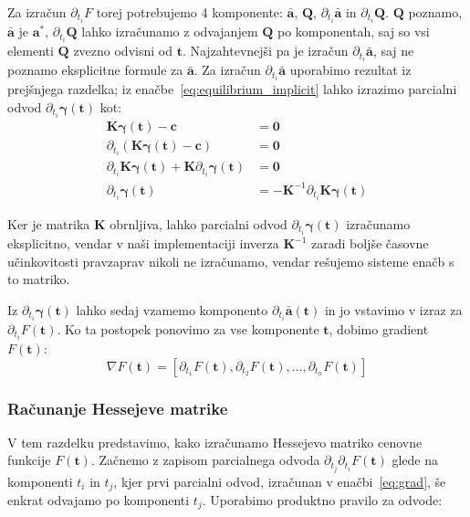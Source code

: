 \documentclass[isrm2, tisk]{fmfdelo}
\newcommand{\aimplicit}{\bar{\mathbf{a}}}
\newcommand{\yimplicit}{\mathbf{\gamma}}
\newcommand{\qmat}{\mathbf{Q}}
\newcommand{\kmat}{\mathbf{K}}
\newcommand{\avec}{\mathbf{a}}
\newcommand{\tvec}{\mathbf{t}}
\begin{document}
Za izračun $\partial_{t_i}F$ torej potrebujemo 4 komponente: $\aimplicit$, $\qmat$, $\partial_{t_i}\aimplicit$ in $\partial_{t_i}\qmat$. $\qmat$ poznamo, $\aimplicit$ je $\avec^*$, $\partial_{t_i}\qmat$ lahko izračunamo z odvajanjem $\qmat$ po komponentah, saj so vsi elementi $\qmat$ zvezno odvisni od $\tvec$. Najzahtevnejši pa je izračun $\partial_{t_i}\aimplicit$, saj ne poznamo eksplicitne formule za $\aimplicit$. Za izračun $\partial_{t_i}\aimplicit$ uporabimo rezultat iz prejšnjega razdelka; iz enačbe~\eqref{eq:equilibrium_implicit} lahko izrazimo parcialni odvod $\partial_{t_i} \yimplicit(\tvec)$ kot:
\begin{equation}
    \label{eq:dkkt}
    \begin{aligned}
        \kmat \yimplicit(\tvec) - \mathbf{c} &= \mathbf{0} \\
        \partial_{t_i}(\kmat \yimplicit(\tvec) - \mathbf{c}) &= \mathbf{0} \\
        \partial_{t_i}\kmat \yimplicit(\tvec) + \kmat \partial_{t_i} \yimplicit(\tvec) &= \mathbf{0} \\
        \partial_{t_i} \yimplicit(\tvec) &= - \kmat^{-1} \partial_{t_i}\kmat \yimplicit(\tvec)
    \end{aligned}
\end{equation}

Ker je matrika $\kmat$ obrnljiva, lahko parcialni odvod $\partial_{t_i} \yimplicit(\tvec)$ izračunamo eksplicitno, vendar v naši implementaciji inverza $\kmat^{-1}$ zaradi boljše časovne učinkovitosti pravzaprav nikoli ne izračunamo, vendar rešujemo sisteme enačb s to matriko.

Iz $\partial_{t_i} \yimplicit(\tvec)$ lahko sedaj vzamemo komponento $\partial_{t_i} \aimplicit(\tvec)$ in jo vstavimo v izraz za $\partial_{t_i} F(\tvec)$. Ko ta postopek ponovimo za vse komponente $\tvec$, dobimo gradient $F(\tvec)$:
\begin{equation}
    \nabla F(\tvec) = [\partial_{t_1} F(\tvec), \partial_{t_2} F(\tvec), \dots, \partial_{t_n} F(\tvec)]
\end{equation}

\subsubsection{Računanje Hessejeve matrike}
\label{sec:hess}

V tem razdelku predstavimo, kako izračunamo Hessejevo matriko cenovne funkcije $F(\tvec)$. Začnemo z zapisom parcialnega odvoda $\partial_{t_j}\partial_{t_i} F(\tvec)$ glede na komponenti $t_i$ in $t_j$, kjer prvi parcialni odvod, izračunan v enačbi~\eqref{eq:grad}, še enkrat odvajamo po komponenti $t_j$. Uporabimo produktno pravilo za odvode:
\end{document}
